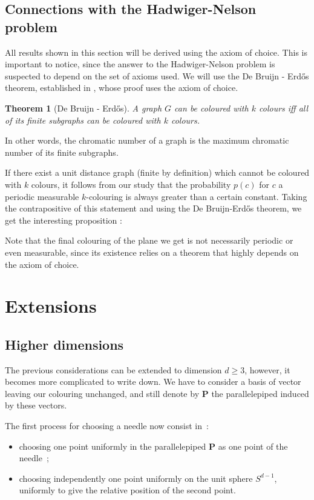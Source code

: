\documentclass[a4paper,11pt]{article}
\newtheorem{theo}{Theorem}
\theoremstyle{definition}
\theoremstyle{remark}
\begin{document}
\subsection{Connections with the Hadwiger-Nelson problem} \label{hn}
All results shown in this section will be derived using the axiom of choice. 
This is important to notice, since the answer to the Hadwiger-Nelson problem is 
suspected to depend on the set of axioms used. We will use the 
De Bruijn - Erd\H{o}s theorem, established in \cite{erdos}, whose proof uses 
the axiom of choice.
\begin{theo}[De Bruijn - Erdős]
 A graph $G$ can be coloured with $k$ colours iff all of its finite subgraphs 
 can be coloured with $k$ colours.
\end{theo}
In other words, the chromatic number of a graph is the maximum chromatic number 
of its finite subgraphs.

If there exist a unit distance graph (finite by definition) which cannot 
be coloured with $k$ colours, it 
follows from our study that the probability $p(c)$ for $c$ a periodic measurable 
$k$-colouring is always greater than a certain constant. Taking the 
contrapositive of this statement and using the De Bruijn-Erdős theorem, we get  
the interesting proposition :

Note that the final colouring of the plane we get is not necessarily periodic 
or even measurable, since its existence relies on a theorem that highly depends 
on the axiom of choice.

\section{Extensions}
\label{ext}
\subsection{Higher dimensions}
\label{dim}
The previous considerations can be extended to dimension $d \geq 3$, however, 
it becomes more complicated to write down. We have to consider a basis of 
vector leaving our colouring unchanged, and still denote by $\mathbf{P}$ the 
parallelepiped induced by these vectors.

The first process for choosing a needle now consist in~: 
\begin{itemize}
	\item choosing one point uniformly in the parallelepiped $ \mathbf{P} $ as 
	one point of the needle~;
	\item choosing independently one point uniformly on the unit sphere 
	$S^{d-1}$, uniformly to give the relative position of the second point.
\end{itemize}
\end{document}
